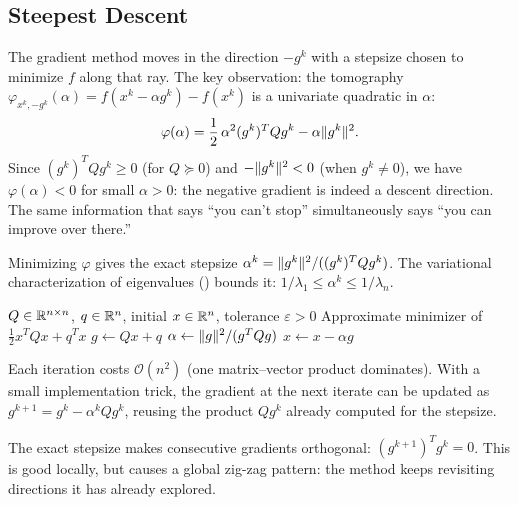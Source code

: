 \subsection{Steepest Descent}\label{sec:steepest-descent}

The gradient method moves in the direction $-g^k$ with a stepsize chosen to minimize $f$ along that ray.
The key observation: the tomography $\varphi_{x^k, -g^k}(\alpha) = f(x^k - \alpha g^k) - f(x^k)$ is a univariate quadratic in $\alpha$:
\begin{equation}\label{eq:sd-tomography}
	\varphi(\alpha) = \frac{1}{2}\, \alpha^2 (g^k)^T Q g^k - \alpha \lVert g^k\rVert^2.
\end{equation}
Since $(g^k)^T Q g^k \geq 0$ (for $Q \succeq 0$) and $-\lVert g^k\rVert^2 < 0$ (when $g^k \neq 0$), we have $\varphi(\alpha) < 0$ for small $\alpha > 0$: the negative gradient is indeed a descent direction.
The same information that says ``you can't stop'' simultaneously says ``you can improve over there.''

Minimizing $\varphi$ gives the exact stepsize $\alpha^k = \lVert g^k\rVert^2 / ((g^k)^T Q g^k)$.
The variational characterization of eigenvalues () bounds it: $1/\lambda_1 \leq \alpha^k \leq 1/\lambda_n$.

\begin{algorithm}
	\caption{Steepest Descent for Quadratic Functions (SDQ)}
	\label{alg:SDQ}
	\begin{algorithmic}[1]
		\Require $Q \in \mathbb{R}^{n \times n}$, $q \in \mathbb{R}^n$, initial $x \in \mathbb{R}^n$, tolerance $\varepsilon > 0$
		\Ensure Approximate minimizer of $\frac{1}{2} x^T Q x + q^T x$
				\State $g \gets Qx + q$
				\State $\alpha \gets \lVert g\rVert^2 / (g^T Q g)$ 
				\State $x \gets x - \alpha g$
			\EndWhile
		\EndProcedure
	\end{algorithmic}
\end{algorithm}

Each iteration costs $\mathcal{O}(n^2)$ (one matrix--vector product dominates).
With a small implementation trick, the gradient at the next iterate can be updated as $g^{k+1} = g^k - \alpha^k Q g^k$, reusing the product $Q g^k$ already computed for the stepsize.

The exact stepsize makes consecutive gradients orthogonal: $(g^{k+1})^T g^k = 0$.
This is good locally, but causes a global zig-zag pattern: the method keeps revisiting directions it has already explored.


